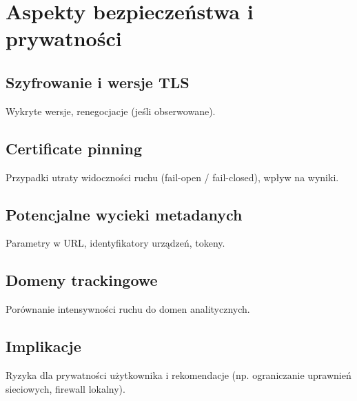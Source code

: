 \chapter{Aspekty bezpieczeństwa i prywatności}

\section{Szyfrowanie i wersje TLS}
Wykryte wersje, renegocjacje (jeśli obserwowane).

\section{Certificate pinning}
Przypadki utraty widoczności ruchu (fail-open / fail-closed), wpływ na wyniki.

\section{Potencjalne wycieki metadanych}
Parametry w URL, identyfikatory urządzeń, tokeny.

\section{Domeny trackingowe}
Porównanie intensywności ruchu do domen analitycznych.

\section{Implikacje}
Ryzyka dla prywatności użytkownika i rekomendacje (np. ograniczanie uprawnień sieciowych, firewall lokalny).